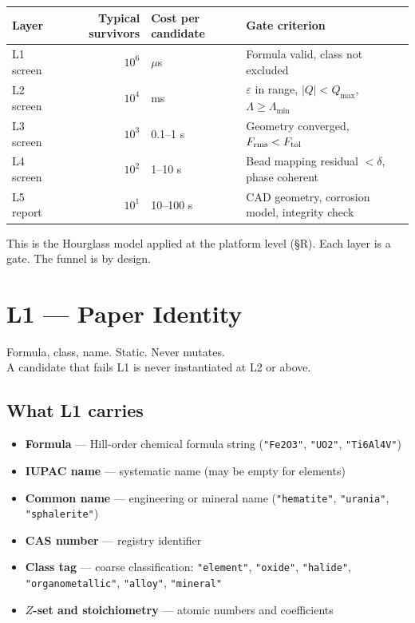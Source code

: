 \documentclass[11pt, a4paper, oneside]{article}
\theoremstyle{definition}
\begin{document}
\begin{center}
\begin{tabular}{lrll}
\toprule
Layer & Typical survivors & Cost per candidate & Gate criterion \\
\midrule
L1 screen & $10^6$ & $\mu$s & Formula valid, class not excluded \\
L2 screen & $10^4$ & ms & $\varepsilon$ in range, $|Q| < Q_{\max}$, $\Lambda \geq \Lambda_{\min}$ \\
L3 screen & $10^3$ & 0.1--1 s & Geometry converged, $F_{\rm rms} < F_{\rm tol}$ \\
L4 screen & $10^2$ & 1--10 s & Bead mapping residual $< \delta$, phase coherent \\
L5 report & $10^1$ & 10--100 s & CAD geometry, corrosion model, integrity check \\
\bottomrule
\end{tabular}
\end{center}

This is the Hourglass model applied at the platform level (§R).  Each
layer is a gate.  The funnel is by design.

\section{L1 — Paper Identity}
\label{sec:l1}

\begin{tcolorbox}[colback=l1col, colframe=blue!40!black,
  title={L1 — Paper Identity},fonttitle=\bfseries\small]
  Formula, class, name.  Static.  Never mutates.\\
  A candidate that fails L1 is never instantiated at L2 or above.
\end{tcolorbox}

\subsection{What L1 carries}

\begin{itemize}
  \item \textbf{Formula} — Hill-order chemical formula string
        (\texttt{"Fe2O3"}, \texttt{"UO2"}, \texttt{"Ti6Al4V"})
  \item \textbf{IUPAC name} — systematic name (may be empty for elements)
  \item \textbf{Common name} — engineering or mineral name
        (\texttt{"hematite"}, \texttt{"urania"}, \texttt{"sphalerite"})
  \item \textbf{CAS number} — registry identifier
  \item \textbf{Class tag} — coarse classification:
        \texttt{"element"}, \texttt{"oxide"}, \texttt{"halide"},
        \texttt{"organometallic"}, \texttt{"alloy"}, \texttt{"mineral"}
  \item \textbf{$Z$-set and stoichiometry} — atomic numbers and coefficients
\end{itemize}
\end{document}
